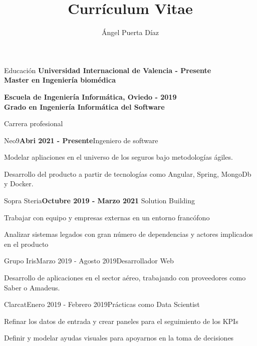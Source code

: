 \documentclass{resume}
\title{Currículum Vitae}
\author{Ángel Puerta Díaz}
\begin{document}
\begin{rSection}{Educación}
\bf {Universidad Internacional de Valencia}
\hfill  {\footnotesize {} - Presente}
\\Master en Ingeniería biomédica

\bf {Escuela de Ingeniería Informática, Oviedo}
\hfill  {\footnotesize {} - 2019}
\\Grado en Ingeniería Informática del Software


\end{rSection}


\begin{rSection}{Carrera profesional}

\begin{rSubsection}{Neo9}{\bf \sffamily Abri 2021 - Presente}{Ingeniero de software}{}
\item Modelar apliaciones en el universo de los seguros bajo metodologías ágiles. 
\item Desarrollo del producto a partir de tecnologías como Angular, Spring, MongoDb y Docker.
\end{rSubsection}

\begin{rSubsection}{Sopra Steria}{\bf \sffamily Octubre 2019 - Marzo 2021 }{Solution Building}{}
\item Trabajar con equipo y empresas externas en un entorno francófono
\item Analizar sistemas legados con gran número de dependencias y actores implicados en el producto
\end{rSubsection}

\begin{rSubsection}{Grupo Iris}{Marzo 2019 - Agosto 2019}{Desarrollador Web}{}
\item Desarrollo de aplicaciones en el sector aéreo, trabajando con proveedores como Saber o Amadeus.
\end{rSubsection}

\begin{rSubsection}{Clarcat}{Enero 2019 - Febrero 2019}{Prácticas como Data Scientist}{}
\item Refinar los datos de entrada y crear paneles para el seguimiento de los KPIs
\item Definir y modelar ayudas visuales para apoyarnos en la toma de decisiones
\end{rSubsection}

\end{rSection}
\end{document}

